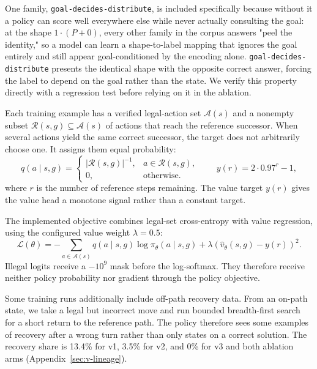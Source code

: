 \documentclass[11pt]{article}
\numberwithin{equation}{section}
\begin{document}
One family, \texttt{goal-decides-distribute}, is included specifically because without it a policy can score well everywhere else while never actually consulting the goal: at the shape $1\cdot(P+0)$, every other family in the corpus answers "peel the identity," so a model can learn a shape-to-label mapping that ignores the goal entirely and still appear goal-conditioned by the encoding alone. \texttt{goal-decides-distribute} presents the identical shape with the opposite correct answer, forcing the label to depend on the goal rather than the state. We verify this property directly with a regression test before relying on it in the ablation.

Each training example has a verified legal-action set $\mathcal{A}(s)$ and a nonempty subset $\mathcal{R}(s,g)\subseteq\mathcal{A}(s)$ of actions that reach the reference successor. When several actions yield the same correct successor, the target does not arbitrarily choose one. It assigns them equal probability:
\begin{equation}
q(a\mid s,g)=
\begin{cases}
|\mathcal{R}(s,g)|^{-1}, & a\in\mathcal{R}(s,g),\\
0, & \text{otherwise}.
\end{cases}
\qquad
y(r)=2\cdot0.97^r-1,
\label{eq:targets}
\end{equation}
where $r$ is the number of reference steps remaining. The value target $y(r)$ gives the value head a monotone signal rather than a constant target.

The implemented objective combines legal-set cross-entropy with value regression, using the configured value weight $\lambda=0.5$:
\begin{equation}
\mathcal{L}(\theta)=-\sum_{a\in\mathcal{A}(s)}q(a\mid s,g)\log\pi_\theta(a\mid s,g)
+\lambda\left(\hat v_\theta(s,g)-y(r)\right)^2.
\label{eq:training-objective}
\end{equation}
Illegal logits receive a $-10^9$ mask before the log-softmax. They therefore receive neither policy probability nor gradient through the policy objective.

Some training runs additionally include off-path recovery data. From an on-path state, we take a legal but incorrect move and run bounded breadth-first search for a short return to the reference path. The policy therefore sees some examples of recovery after a wrong turn rather than only states on a correct solution. The recovery share is 13.4\% for v1, 3.5\% for v2, and 0\% for v3 and both ablation arms (Appendix~\ref{sec:v-lineage}).
\end{document}
